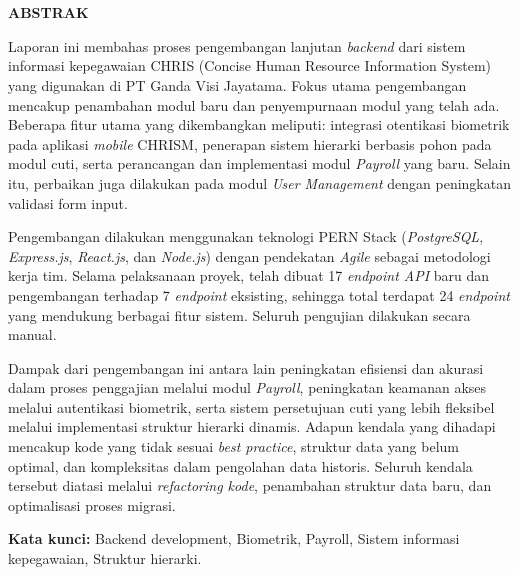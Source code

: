 \chapter*{\Judul}
\singlespacing
\begin{center}
    
    \vspace{-4em}
    
    \penulis
    
	\bigskip
    
    \textbf{ABSTRAK}
    
\end{center}


\vspace*{0.2cm}
{
	\setlength{\parindent}{0pt}

	\bigskip
	\bigskip

	Laporan ini membahas proses pengembangan lanjutan \textit{backend} dari sistem informasi kepegawaian CHRIS (Concise Human Resource Information System) yang digunakan di PT Ganda Visi Jayatama. Fokus utama pengembangan mencakup penambahan modul baru dan penyempurnaan modul yang telah ada. Beberapa fitur utama yang dikembangkan meliputi: integrasi otentikasi biometrik pada aplikasi \textit{mobile} CHRISM, penerapan sistem hierarki berbasis pohon pada modul cuti, serta perancangan dan implementasi modul \textit{Payroll} yang baru. Selain itu, perbaikan juga dilakukan pada modul \textit{User Management} dengan peningkatan validasi form input.

	Pengembangan dilakukan menggunakan teknologi PERN Stack (\textit{PostgreSQL}, \textit{Express.js}, \textit{React.js}, dan \textit{Node.js}) dengan pendekatan \textit{Agile} sebagai metodologi kerja tim. Selama pelaksanaan proyek, telah dibuat 17 \textit{endpoint API} baru dan pengembangan terhadap 7 \textit{endpoint} eksisting, sehingga total terdapat 24 \textit{endpoint} yang mendukung berbagai fitur sistem. Seluruh pengujian dilakukan secara manual.

	Dampak dari pengembangan ini antara lain peningkatan efisiensi dan akurasi dalam proses penggajian melalui modul \textit{Payroll}, peningkatan keamanan akses melalui autentikasi biometrik, serta sistem persetujuan cuti yang lebih fleksibel melalui implementasi struktur hierarki dinamis. Adapun kendala yang dihadapi mencakup kode yang tidak sesuai \textit{best practice}, struktur data yang belum optimal, dan kompleksitas dalam pengolahan data historis. Seluruh kendala tersebut diatasi melalui \textit{refactoring kode}, penambahan struktur data baru, dan optimalisasi proses migrasi.

	\bigskip
 
	\textbf{Kata kunci:} Backend development, Biometrik, Payroll, Sistem informasi kepegawaian, Struktur hierarki.
}

\onehalfspacing